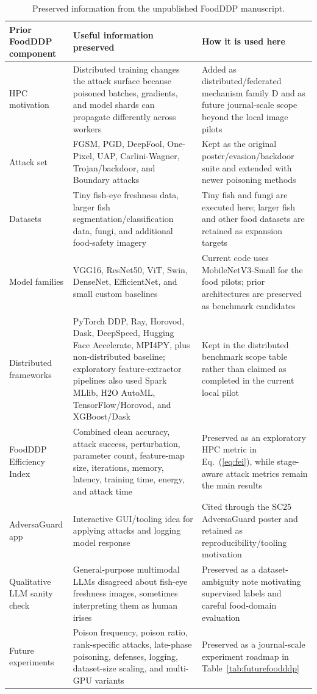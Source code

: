 \documentclass[conference]{IEEEtran}
\begin{document}
\begin{table}[t]
\centering
\caption{Preserved information from the unpublished FoodDDP manuscript.}
\label{tab:foodddpmap}
\small
\begin{tabular}{p{}p{}p{}}
\toprule
Prior FoodDDP component & Useful information preserved & How it is used here \\
\midrule
HPC motivation & Distributed training changes the attack surface because poisoned batches, gradients, and model shards can propagate differently across workers & Added as distributed/federated mechanism family D and as future journal-scale scope beyond the local image pilots \\
Attack set & FGSM, PGD, DeepFool, One-Pixel, UAP, Carlini-Wagner, Trojan/backdoor, and Boundary attacks & Kept as the original poster/evasion/backdoor suite and extended with newer poisoning methods \\
Datasets & Tiny fish-eye freshness data, larger fish segmentation/classification data, fungi, and additional food-safety imagery & Tiny fish and fungi are executed here; larger fish and other food datasets are retained as expansion targets \\
Model families & VGG16, ResNet50, ViT, Swin, DenseNet, EfficientNet, and small custom baselines & Current code uses MobileNetV3-Small for the food pilots; prior architectures are preserved as benchmark candidates \\
Distributed frameworks & PyTorch DDP, Ray, Horovod, Dask, DeepSpeed, Hugging Face Accelerate, MPI4PY, plus non-distributed baseline; exploratory feature-extractor pipelines also used Spark MLlib, H2O AutoML, TensorFlow/Horovod, and XGBoost/Dask & Kept in the distributed benchmark scope table rather than claimed as completed in the current local pilot \\
FoodDDP Efficiency Index & Combined clean accuracy, attack success, perturbation, parameter count, feature-map size, iterations, memory, latency, training time, energy, and attack time & Preserved as an exploratory HPC metric in Eq.~(\ref{eq:fei}), while stage-aware attack metrics remain the main results \\
AdversaGuard app & Interactive GUI/tooling idea for applying attacks and logging model response & Cited through the SC25 AdversaGuard poster and retained as reproducibility/tooling motivation \\
Qualitative LLM sanity check & General-purpose multimodal LLMs disagreed about fish-eye freshness images, sometimes interpreting them as human irises & Preserved as a dataset-ambiguity note motivating supervised labels and careful food-domain evaluation \\
Future experiments & Poison frequency, poison ratio, rank-specific attacks, late-phase poisoning, defenses, logging, dataset-size scaling, and multi-GPU variants & Preserved as a journal-scale experiment roadmap in Table~\ref{tab:futurefoodddp} \\
\bottomrule
\end{tabular}
\end{table}
\end{document}
